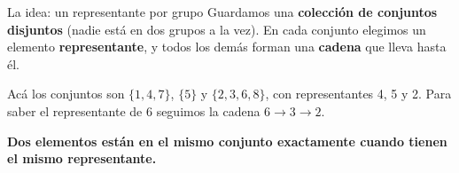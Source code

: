 \documentclass{beamer}
\begin{document}
\begin{frame}{La idea: un representante por grupo}
    Guardamos una \textbf{colección de conjuntos disjuntos} (nadie está en dos
    grupos a la vez). En cada conjunto elegimos un elemento
    \textbf{representante}, y todos los demás forman una \textbf{cadena} que
    lleva hasta él.

    \vspace{0.2cm}
    \begin{center}
    \end{center}

    \vspace{0.1cm}
    Acá los conjuntos son $\{1,4,7\}$, $\{5\}$ y $\{2,3,6,8\}$, con
    representantes 4, 5 y 2. Para saber el representante de 6 seguimos la
    cadena $6 \to 3 \to 2$.

    \vspace{0.1cm}
    \textbf{Dos elementos están en el mismo conjunto exactamente cuando tienen
    el mismo representante.}
\end{frame}
\end{document}
